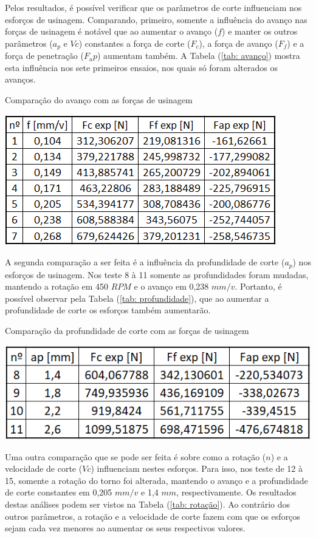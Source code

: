 \documentclass[deposito, acronym, symbols]{fei}
\begin{document}
Pelos resultados, é possível verificar que os parâmetros de corte influenciam nos esforços de usinagem. Comparando, primeiro, somente a influência do avanço nas forças de usinagem é notável que ao aumentar o avanço ($f$) e manter os outros parâmetros ($a_p$ e $Vc$) constantes a força de corte ($F_c$), a força de avanço ($F_f$) e a força de penetração ($F_ap$) aumentam também. A Tabela (\ref{tab: avanço}) mostra esta influência nos sete primeiros ensaios, nos quais só foram alterados os avanços.

\begin{table}[!htb]
 \centering
    \caption{Comparação do avanço com as forças de usinagem}
    \includegraphics[width=0.5\linewidth]{Imagens/fxforças.png}
    \label{tab: avanço}
 \end{table}

A segunda comparação a ser feita é a influência da profundidade de corte ($a_p$) nos esforços de usinagem. Nos teste 8 à 11 somente as profundidades foram mudadas, mantendo a rotação em 450 $RPM$ e o avanço em 0,238 $mm/v$. Portanto, é possível observar pela Tabela (\ref{tab: profundidade}), que ao aumentar a profundidade de corte os esforços também aumentarão.

\begin{table}[!htb]
 \centering
    \caption{Comparação da profundidade de corte com as forças de usinagem}
    \includegraphics[width=0.6\linewidth]{Imagens/apxforças.png}
    \label{tab: profundidade}
 \end{table}

Uma outra comparação que se pode ser feita é sobre como a rotação ($n$) e a velocidade de corte ($Vc$) influenciam nestes esforços. Para isso, nos teste de 12 à 15, somente a rotação do torno foi alterada, mantendo o avanço e a profundidade de corte constantes em 0,205 $mm/v$ e 1,4 $mm$, respectivamente. Os resultados destas análises podem ser vistos na Tabela (\ref{tab: rotação}). Ao contrário dos outros parâmetros, a rotação e a velocidade de corte fazem com que os esforços sejam cada vez menores ao aumentar os seus respectivos valores.
\end{document}
